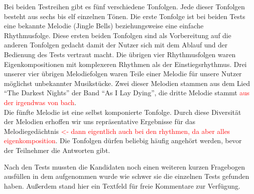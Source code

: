 \documentclass{acm_proc_article-sp}
\begin{document}
Bei beiden Testreihen gibt es fünf verschiedene Tonfolgen. Jede dieser Tonfolgen besteht aus sechs bis elf einzelnen Tönen. Die erste Tonfolge ist bei beiden Tests eine bekannte Melodie (Jingle Bells) beziehungsweise eine einfache Rhythmusfolge. Diese ersten beiden Tonfolgen sind als Vorbereitung auf die anderen Tonfolgen gedacht damit der Nutzer sich mit dem Ablauf und der Bedienung des Tests vertraut macht.
Die übrigen vier Rhythmusfolgen waren Eigenkompositionen mit komplexeren Rhythmen als der Einstiegsrhythmus.
Drei unserer vier übrigen Melodiefolgen waren Teile einer Melodie für unsere Nutzer möglichst unbekannter Musikstücke.
Zwei dieser Melodien stammen aus dem Lied "`The Darkest Nights"' der Band "`As I Lay Dying"', die dritte Melodie stammt \textcolor{red}{aus der irgendwas von bach}.\\
Die fünfte Melodie ist eine selbst komponierte Tonfolge. Durch diese Diversität der Melodien erhoffen wir uns repräsentative Ergebnisse für das Melodiegedächtnis \textcolor{red}{<- dann eigentlich auch bei den rhythmen, da aber alles eigenkomposition}. Die Tonfolgen dürfen beliebig häufig angehört werden, bevor der Teilnehmer die Antworten gibt.
 
Nach den Tests mussten die Kandidaten noch einen weiteren kurzen Fragebogen ausfüllen in dem aufgenommen wurde wie schwer sie die einzelnen Tests gefunden haben. Außerdem stand hier ein Textfeld für freie Kommentare zur Verfügung. 
\end{document}
